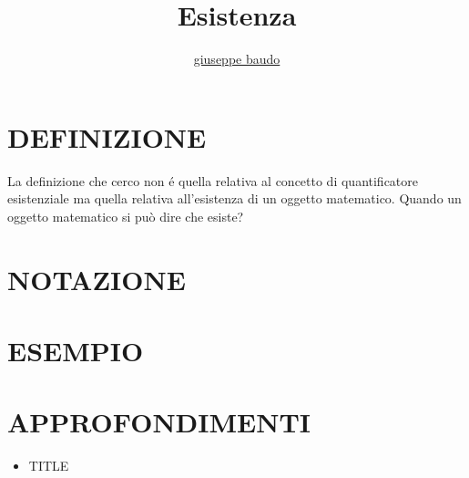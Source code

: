 \documentclass[a4paper,10pt]{article}
\title{Esistenza}
\author{\href{http://www.baudo.hol.es}{giuseppe baudo}}
\begin{document}
\maketitle

\section{DEFINIZIONE}
La definizione che cerco non \'{e} quella relativa al concetto di quantificatore esistenziale ma quella relativa all'esistenza di un oggetto matematico.
Quando un oggetto matematico si può dire che esiste?

\section{NOTAZIONE}

\section{ESEMPIO}

\section{APPROFONDIMENTI}
\begin{itemize}
 \item TITLE
\end{itemize}
\end{document}
